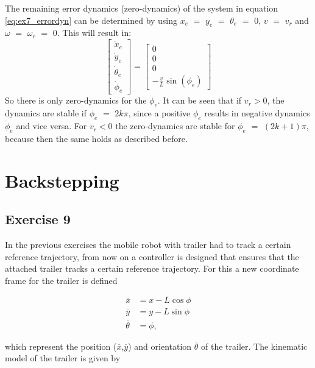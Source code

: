 The remaining error dynamics (zero-dynamics) of the system in equation \eqref{eq:ex7_errordyn} can be determined by using $x_e$ $=$ $y_e$ $=$ $\theta_e$ $=$ $
0$, $v$ $=$ $v_r$ and $\omega$ $=$ $\omega_r$ $=$ $0$. This will result in:
\begin{equation}
    \begin{bmatrix}
    \dot{x}_e \\
    \dot{y}_e \\
    \dot{\theta}_e \\
    \dot{\phi}_e
    \end{bmatrix}
    =
    \begin{bmatrix}
    0 \\
    0 \\
    0 \\
    - \frac{v}{L}\sin(\phi_e)
    \end{bmatrix}
    \label{eq:ex8_zero}
\end{equation}
So there is only zero-dynamics for the $\dot{\phi}_e$. It can be seen that if $v_r>0$, the dynamics are stable if $\phi_e$ $=$ $2 k \pi$, since a positive $\phi_e$ results in negative dynamics $\dot{\phi}_e$ and vice versa. For $v_r < 0$ the zero-dynamics are stable for $\phi_e$ $=$ $(2k + 1) \pi$, because then the same holds as described before.


\section{Backstepping}


\subsection{Exercise 9}
In the previous exercises the mobile robot with trailer had to track a certain reference trajectory, from now on a controller is designed that ensures that the attached trailer tracks a certain reference trajectory. For this a new coordinate frame for the trailer is defined

\begin{align}
\overline{x} &= x - L \cos{\phi} \label{eq:ex9_trailercoords_a}\\
\overline{y} &= y - L \sin{\phi} \label{eq:ex9_trailercoords_b}\\
\overline{\theta} &= \phi,
\label{eq:ex9_trailercoords_c}
\end{align}

which represent the position ($\overline{x}$,$\overline{y}$) and orientation $\overline{\theta}$ of the trailer. The kinematic model of the trailer is given by

